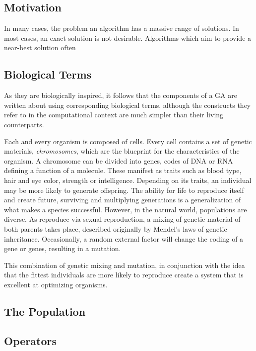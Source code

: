 \cite{Ding2007}

\subsection{Motivation}
In many cases, the problem an algorithm has a massive range of solutions. In most cases, an exact solution is not desirable. Algorithms which aim to provide a near-best solution often 

\subsection{Biological Terms}
As they are biologically inspired, it follows that the components of a GA are written about using corresponding biological terms, although the constructs they refer to in the computational context are much simpler than their living counterparts.

Each and every organism is composed of cells. Every cell contains a set of genetic materials, \textit{chromosomes}, which are the blueprint for the characteristics of the organism. A chromosome can be divided into genes, codes of DNA or RNA defining a function of a molecule. These manifest as traits such as blood type, hair and eye color, strength or intelligence. Depending on its traits, an individual may be more likely to generate offspring. The ability for life to reproduce itself and create future, surviving and multiplying generations is a generalization of what makes a species successful. However, in the natural world, populations are diverse. As reproduce via sexual reproduction, a mixing of genetic material of both parents takes place, described originally by Mendel's laws of genetic inheritance. Occasionally, a random external factor will change the coding of a gene or genes, resulting in a mutation.

This combination of genetic mixing and mutation, in conjunction with the idea that the fittest individuals are more likely to reproduce create a system that is excellent at optimizing organisms. 
  

\subsection{The Population}


\subsection{Operators}


